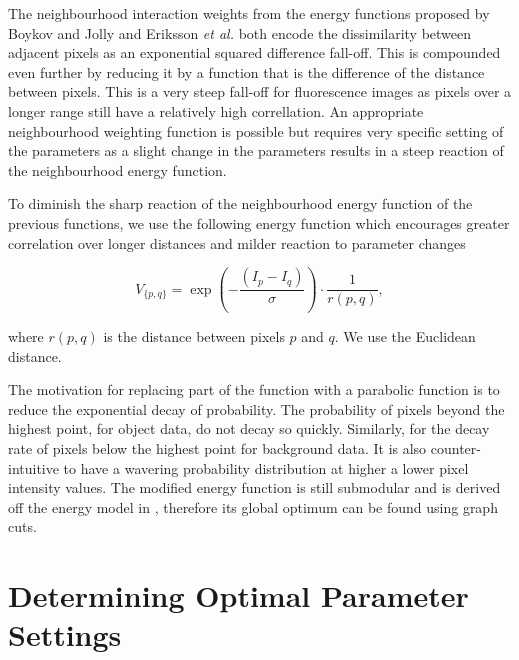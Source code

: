 \begin{definition}
	The neighbourhood interaction weights from the energy functions proposed by Boykov and Jolly \citep{Boykov2001_2} and Eriksson \textit{et al.} \citep{Eriksson2006} both encode the dissimilarity between adjacent pixels as an exponential squared difference fall-off. This is compounded even further by reducing it by a function that is the difference of the distance between pixels. This is a very steep fall-off for fluorescence images as pixels over a longer range still have a relatively high correllation. An appropriate neighbourhood weighting function is possible but requires very specific setting of the parameters as a slight change in the parameters results in a steep reaction of the neighbourhood energy function.
	
	To diminish the sharp reaction of the neighbourhood energy function of the previous functions, we use the following energy function which encourages greater correlation over longer distances and milder reaction to parameter changes
	
	\begin{equation}
	V_{\{p,q\}} = \exp\left( -\frac{(I_p-I_q)}{\sigma} \right)\cdot\frac{1}{r(p,q)},
	\end{equation}
	
	where $r(p,q)$ is the distance between pixels $p$ and $q$. We use the Euclidean distance.
	
\end{definition}

The motivation for replacing part of the function with a parabolic function is to reduce the exponential decay of probability. The probability of pixels beyond the highest point, for object data, do not decay so quickly. Similarly, for the decay rate of pixels below the highest point for background data. It is also counter-intuitive to have a wavering probability distribution at higher a lower pixel intensity values. The modified energy function is still submodular and is derived off the energy model in , therefore its global optimum can be found using graph cuts.



\section{Determining Optimal Parameter Settings}
\label{sec:optimalparameters}

